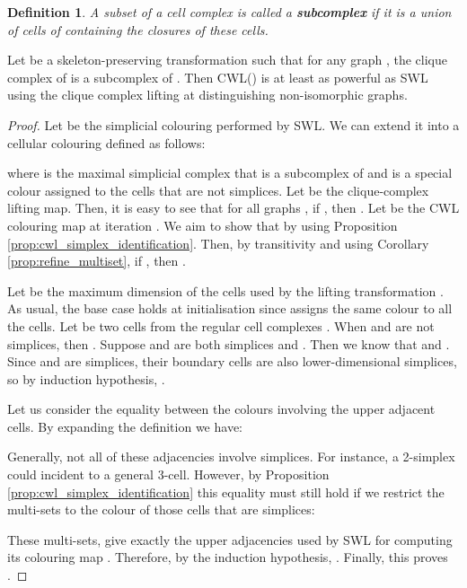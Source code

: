 \documentclass{article}
\newtheorem{definition}[theorem]{Definition}
\begin{document}
\begin{definition}
A subset  of a cell complex  is called a \textbf{subcomplex} if it is a union of cells of  containing the closures of these cells.
\end{definition}

\begin{theorem}
Let  be a skeleton-preserving transformation such that for any graph , the clique complex of  is a subcomplex of . Then CWL() is at least as powerful as SWL using the clique complex lifting at distinguishing non-isomorphic graphs. 
\end{theorem}

\begin{proof}

Let  be the simplicial colouring performed by SWL. We can extend it into a cellular colouring  defined as follows:

where  is the maximal simplicial complex that is a subcomplex of  and  is a special colour assigned to the cells that are not simplices. Let  be the clique-complex lifting map. Then, it is easy to see that for all graphs , if , then . Let  be the CWL colouring map at iteration . We aim to show that  by using Proposition \ref{prop:cwl_simplex_identification}. Then, by transitivity and using Corollary \ref{prop:refine_multiset}, if , then . 

Let  be the maximum dimension of the cells used by the lifting transformation . As usual, the base case holds at initialisation since  assigns the same colour to all the cells. Let  be two cells from the regular cell complexes . When  and  are not simplices, then . Suppose  and  are both simplices and . Then we know that  and . Since  and  are simplices, their boundary cells are also lower-dimensional simplices, so by induction hypothesis, .

Let us consider the equality between the colours involving the upper adjacent cells. By expanding the definition we have: 

Generally, not all of these adjacencies involve simplices. For instance, a 2-simplex could incident to a general 3-cell. However, by Proposition \ref{prop:cwl_simplex_identification} this equality must still hold if we restrict the multi-sets to the colour of those cells that are simplices: 

These multi-sets, give exactly the upper adjacencies used by SWL for computing its colouring map . Therefore, by the induction hypothesis, . Finally, this proves . 
\end{proof}
\end{document}
